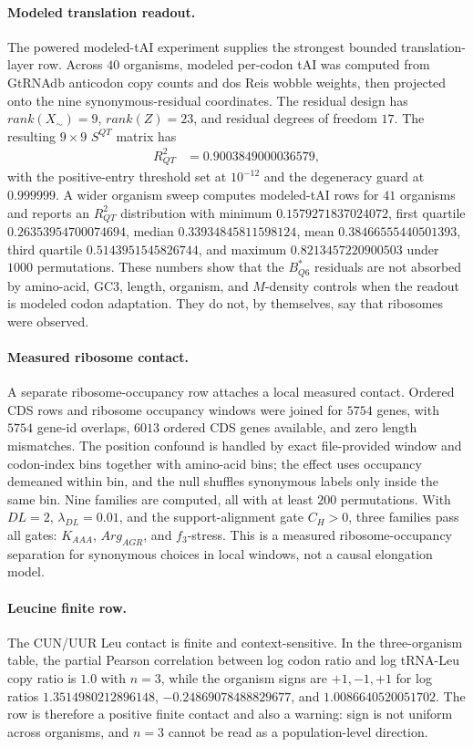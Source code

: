 \paragraph{Modeled translation readout.}
The powered modeled-tAI experiment supplies the strongest bounded translation-layer row.  Across $40$ organisms, modeled per-codon tAI was computed from GtRNAdb anticodon copy counts and dos Reis wobble weights, then projected onto the nine synonymous-residual coordinates.  The residual design has $rank(X_{\sim})=9$, $rank(Z)=23$, and residual degrees of freedom $17$.  The resulting $9 \times 9$ $S^{QT}$ matrix has
$$
\begin{aligned}
R^2_{QT} &= 0.9003849000036579,
\end{aligned}
$$
with the positive-entry threshold set at $10^{-12}$ and the degeneracy guard at $0.999999$.  A wider organism sweep computes modeled-tAI rows for $41$ organisms and reports an $R^2_{QT}$ distribution with minimum $0.1579271837024072$, first quartile $0.26353954700074694$, median $0.33934845811598124$, mean $0.38466555440501393$, third quartile $0.5143951545826744$, and maximum $0.8213457220900503$ under $1000$ permutations.  These numbers show that the $B^{*}_{Q6}$ residuals are not absorbed by amino-acid, GC3, length, organism, and $M$-density controls when the readout is modeled codon adaptation.  They do not, by themselves, say that ribosomes were observed.

\paragraph{Measured ribosome contact.}
A separate ribosome-occupancy row attaches a local measured contact.  Ordered CDS rows and ribosome occupancy windows were joined for $5754$ genes, with $5754$ gene-id overlaps, $6013$ ordered CDS genes available, and zero length mismatches.  The position confound is handled by exact file-provided window and codon-index bins together with amino-acid bins; the effect uses occupancy demeaned within bin, and the null shuffles synonymous labels only inside the same bin.  Nine families are computed, all with at least $200$ permutations.  With $DL=2$, $\lambda_{DL}=0.01$, and the support-alignment gate $C_H>0$, three families pass all gates: $K_{AAA}$, $Arg_{AGR}$, and $f_3$-stress.  This is a measured ribosome-occupancy separation for synonymous choices in local windows, not a causal elongation model.

\paragraph{Leucine finite row.}
The CUN/UUR Leu contact is finite and context-sensitive.  In the three-organism table, the partial Pearson correlation between log codon ratio and log tRNA-Leu copy ratio is $1.0$ with $n=3$, while the organism signs are $+1,-1,+1$ for log ratios $1.3514980212896148$, $-0.24869078488829677$, and $1.0086640520051702$.  The row is therefore a positive finite contact and also a warning: sign is not uniform across organisms, and $n=3$ cannot be read as a population-level direction.

